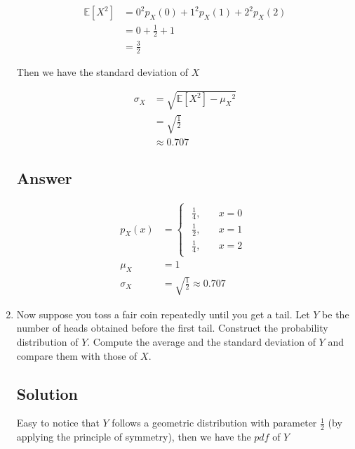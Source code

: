 \documentclass[12pt]{article}
\newcommand{\bE}{\mathbb{E}}
\begin{document}
\begin{enumerate}[start=1,label={\bfseries Part \arabic*:},leftmargin=0in]
			\[
				\begin{aligned}
					\bE\left[X^2\right] &= 0^2p_X(0) + 1^2p_X(1) + 2^2p_X(2)\\
					&= 0 + \frac{1}{2} + 1\\
					&= \frac{3}{2}
				\end{aligned}
			\]
			
			Then we have the standard deviation of $X$
			
			\[
			\begin{aligned}
				\sigma_X &= \sqrt{\bE\left[X^2\right] - {\mu_X}^2}\\
				&= \sqrt{\frac{1}{2}}\\
				&\approx 0.707
			\end{aligned}
			\]
		
		\subsection*{Answer}
		
			\[\boxed{
				\begin{aligned}
					p_X(x) &=
					\begin{cases}
						\begin{aligned}
							\frac{1}{4},&\quad x = 0\\
							\frac{1}{2},&\quad x = 1\\
							\frac{1}{4},&\quad x = 2
						\end{aligned}
					\end{cases}\\
					\mu_X &= 1\\
					\sigma_X &= \sqrt{\frac{1}{2}} \approx 0.707
				\end{aligned}
			}\]
		
		\bigskip\item Now suppose you toss a fair coin repeatedly until you get a tail. Let $Y$ be the number of heads obtained before the first tail. Construct the probability distribution of $Y$. Compute the average and the standard deviation of $Y$ and compare them with those of $X$.
		
		\subsection*{Solution}
		
			Easy to notice that $Y$ follows a geometric distribution with parameter $\frac{1}{2}$ (by applying the principle of symmetry), then we have the $pdf$ of $Y$
			

\end{enumerate}
\end{document}
